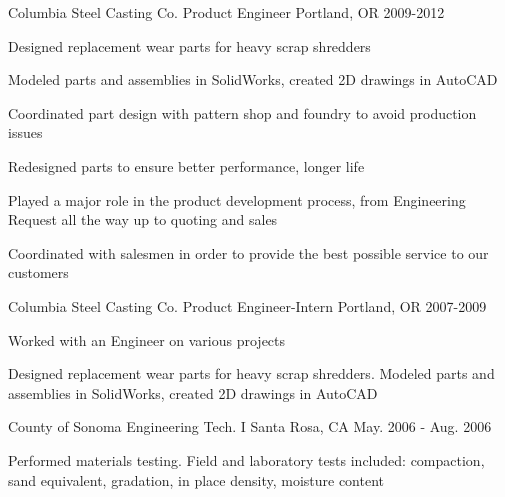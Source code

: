 \begin{cventries}
\cventry
{Columbia Steel Casting Co.} %
{Product Engineer} %
{Portland, OR} %
{2009-2012} %
{ %
\begin{cvitems}
\item {Designed replacement wear parts for heavy scrap shredders} 
\item{Modeled parts and assemblies in SolidWorks, created 2D drawings in AutoCAD} 
\item{Coordinated part design with pattern shop and foundry to avoid production issues}
\item{Redesigned parts to ensure better performance, longer life}
\item{Played a major role in the product development process, from Engineering Request all the way up to quoting and sales} 
\item{Coordinated with salesmen in order to provide the best possible service to our customers}
\end{cvitems}
}


\cventry
{Columbia Steel Casting Co.} %
{Product Engineer-Intern} %
{Portland, OR} %
{2007-2009} %
{ %
\begin{cvitems}
\item {Worked with an Engineer on various projects}
\item {Designed replacement wear parts for heavy scrap shredders. Modeled parts and assemblies in SolidWorks, created 2D drawings in AutoCAD}
\end{cvitems}
}


\cventry
{County of Sonoma} %
{Engineering Tech. I} %
{Santa Rosa, CA} %
{May. 2006 - Aug. 2006} %
{ %
\begin{cvitems}
\item {Performed materials testing. Field and laboratory tests included: compaction, sand equivalent, gradation, in place density, moisture content}
\end{cvitems} 
}


\end{cventries}